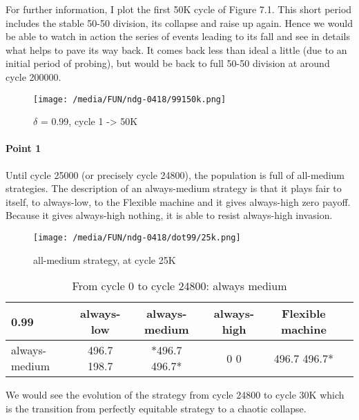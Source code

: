 \documentclass[12.5pt]{report}
\begin{document}
For further information, I plot the first 50K cycle of Figure 7.1. This short period includes the stable 50-50 division, its collapse and raise up again. Hence we would be able to watch in action the series of events leading to its fall and see in details what helps to pave its way back. It comes back less than ideal a little (due to an initial period of probing), but would be back to full 50-50 division at around cycle 200000.

\begin{figure}[h!]
\center
\texttt{[image: /media/FUN/ndg-0418/99150k.png]}
\caption{$\delta$ = 0.99, cycle 1 -> 50K}
\end{figure}

\paragraph{Point 1}

Until cycle 25000 (or precisely cycle 24800), the population is full of all-medium strategies. The description of an always-medium strategy is that it plays fair to itself, to always-low, to the Flexible machine and it gives always-high zero payoff. Because it gives always-high nothing, it is able to resist always-high invasion.

\begin{figure}[h!]
\center
\texttt{[image: /media/FUN/ndg-0418/dot99/25k.png]}
\caption{all-medium strategy, at cycle 25K}
\end{figure}

\begin{table}[h!]
\center
\begin{tabular}{l|ccccc}
\textbf{0.99}& always-low & always-medium & always-high & Flexible machine\\
\hline
always-medium  &  496.7 198.7 &  *496.7 496.7*   &    0 0   &     496.7 496.7* \\
\end{tabular}
\caption{From cycle 0 to cycle 24800: always medium}
\end{table}

We would see the evolution of the strategy from cycle 24800 to cycle 30K which is the transition from perfectly equitable strategy to a chaotic collapse.\\
\end{document}
